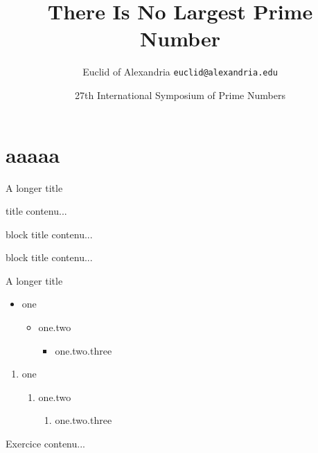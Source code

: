 \documentclass[aspectratio=169]{beamer}
\title[SHORT title]{There Is No Largest Prime Number}
\date[ISPN ’80]{27th International Symposium of Prime Numbers}
\author[Euclid]{Euclid of Alexandria \texttt{euclid@alexandria.edu}}
\institute{institute}
\begin{document}
    \begin{frame}[plain]
        \titlepage
    \end{frame}

\section{aaaaa}

    \begin{frame}[t]{A longer title}
        \begin{block}{title}
            contenu...
        \end{block}
        \begin{alertblock}{block title}
            contenu...
        \end{alertblock}
        \begin{exampleblock}{block title}
            contenu...
        \end{exampleblock}
    \end{frame}

    \begin{frame}{A longer title}
        \begin{itemize}
            \item one
            \begin{itemize}
                \item one.two
                \begin{itemize}
                    \item one.two.three
                \end{itemize}
            \end{itemize}
        \end{itemize}

        \begin{enumerate}
            \item one
            \begin{enumerate}
                \item one.two
                \begin{enumerate}
                    \item one.two.three
                \end{enumerate}
            \end{enumerate}
        \end{enumerate}
    \end{frame}

    \begin{exerciseframe}{Exercice}
        contenu...
    \end{exerciseframe}
\end{document}
